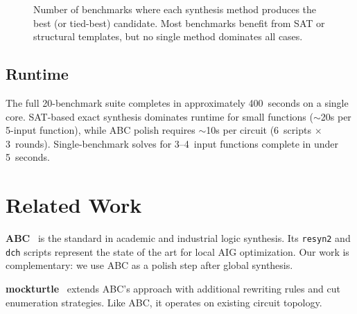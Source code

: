 \documentclass[conference,10pt]{IEEEtran}
\begin{document}
\begin{figure}[t]
\centering
{}
\caption{Number of benchmarks where each synthesis method produces the best (or tied-best) candidate. Most benchmarks benefit from SAT or structural templates, but no single method dominates all cases.}
\label{fig:method_contrib}
\end{figure}

\subsection{Runtime}

The full 20-benchmark suite completes in approximately 400~seconds on a single core. SAT-based exact synthesis dominates runtime for small functions ($\sim$20s per 5-input function), while ABC polish requires $\sim$10s per circuit (6~scripts $\times$ 3~rounds). Single-benchmark solves for 3--4~input functions complete in under 5~seconds.

\section{Related Work}

\textbf{ABC}~\cite{abc} is the standard in academic and industrial logic synthesis. Its \texttt{resyn2} and \texttt{dch} scripts represent the state of the art for local AIG optimization. Our work is complementary: we use ABC as a polish step after global synthesis.

\textbf{mockturtle}~\cite{mockturtle} extends ABC's approach with additional rewriting rules and cut enumeration strategies. Like ABC, it operates on existing circuit topology.
\end{document}
